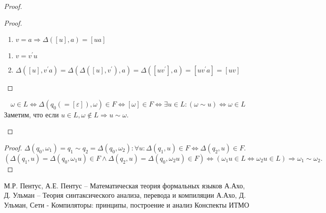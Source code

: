\documentclass[11pt,a4paper]{article}
\theoremstyle{definition}
\theoremstyle{definition}
\theoremstyle{definition}
\begin{document}
\begin{proof}
\begin{description}
{\begin{proof}
\begin{description}
{\begin{enumerate}
\item{$v = a\Rightarrow\Delta([u], a) = [ua]$}
\end{enumerate}}
\item[Шаг:]{
\begin{enumerate}[1)]
\item{$v = v^\prime u$}
\item{$\Delta([u], v^\prime a) = \Delta(\Delta([u],v^\prime), a) = \Delta([uv^\prime], a)=[uv^\prime a]=[uv]$}
\end{enumerate}}
\end{description}
\end{proof}}
\[\omega\in L \Leftrightarrow\Delta(q_0 (=[\varepsilon]),\omega)\in F \Leftrightarrow[\omega]\in F \Leftrightarrow\exists u\in L: (\omega\sim u) \Leftrightarrow\omega\in L\]
Заметим, что если $u\in L, \omega \notin L\Rightarrow u\sim \omega.$

\end{description}
\end{proof}
\begin{proof}
$\Delta(q_0,\omega_1)=q_1\sim q_2=\Delta(q_0, \omega_2): \forall u :\Delta(q_1,u)\in F\Leftrightarrow\Delta (q_2, u)\in F.$\\
\[(\Delta(q_1, u)=\Delta(q_0, \omega_1 u) \in F\wedge \Delta(q_2, u)=\Delta(q_0,\omega_2 u)\in F)\Leftrightarrow(\omega_1 u\in L\Leftrightarrow\omega_2 u\in L)\Rightarrow \omega_1\sim\omega_2.\]
\end{proof}
\newpage
\begin{thebibliography}{0}
М.Р. Пентус, А.Е. Пентус -- Математическая теория формальных языков
А.Ахо, Д. Ульман -- Теория синтаксического анализа, перевода и компиляции
А.Ахо, Д. Ульман, Сети - Компиляторы: принципы, построение и анализ
Конспекты ИТМО
\end{thebibliography}
\end{document}

